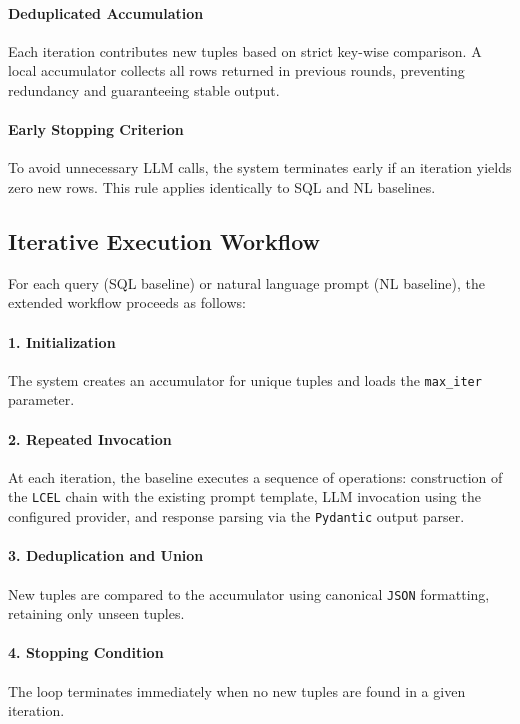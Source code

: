 \paragraph{Deduplicated Accumulation}
Each iteration contributes new tuples based on strict key-wise comparison. A local accumulator collects all rows returned in previous rounds, preventing redundancy and guaranteeing stable output.

\paragraph{Early Stopping Criterion}
To avoid unnecessary LLM calls, the system terminates early if an iteration yields zero new rows. This rule applies identically to SQL and NL baselines.

\subsection{Iterative Execution Workflow}

For each query (SQL baseline) or natural language prompt (NL baseline), the extended workflow proceeds as follows:

\paragraph{1. Initialization}
The system creates an accumulator for unique tuples and loads the \texttt{max\_iter} parameter.

\paragraph{2. Repeated Invocation}
At each iteration, the baseline executes a sequence of operations: construction of the \texttt{LCEL} chain with the existing prompt template, LLM invocation using the configured provider, and response parsing via the \texttt{Pydantic} output parser.

\paragraph{3. Deduplication and Union}
New tuples are compared to the accumulator using canonical \texttt{JSON} formatting, retaining only unseen tuples.

\paragraph{4. Stopping Condition}
The loop terminates immediately when no new tuples are found in a given iteration.

